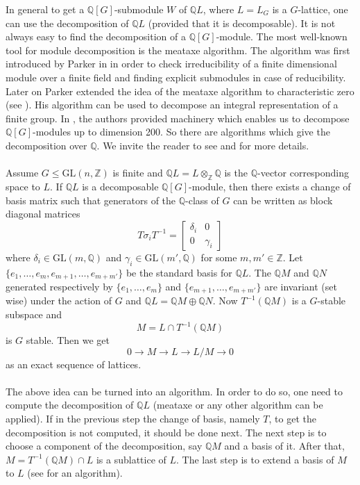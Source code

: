 \documentclass[a4paper, 14pt]{extarticle}
\theoremstyle{plain}
\theoremstyle{definition}
\newcommand{\Z}{\ensuremath{\mathbb{Z}}}
\newcommand{\Q}{\ensuremath{\mathbb{Q}}}
\begin{document}
\noindent
In general to get a $\Q[G]$-submodule $W$ of $\Q L$, where $L = L_G$ is a $G$-lattice, one can use the decomposition of $\Q L$ (provided that it is decomposable). It is not always easy to find the decomposition of a $\Q[G]$-module. The most well-known tool for module decomposition is the meataxe algorithm. The algorithm was first introduced by Parker in \cite{Parker} in order to check irreducibility of a finite dimensional module over a finite field and finding explicit submodules in case of reducibility. Later on Parker extended the idea of the meataxe algorithm to characteristic zero (see \cite{Parker2}). His algorithm can be used to decompose an integral representation of a finite group. In \cite{Plesken2}, the authors provided machinery which enables us to decompose $\Q[G]$-modules up to dimension 200. So there are algorithms which give the decomposition over $\Q$. We invite the reader to see \cite{Lux} and \cite{Holt} for more details. \\
\\
Assume $G \leq \mathrm{GL}(n,\Z)$ is finite and $\Q L = L \otimes_{\Z} \Q$ is the $\Q$-vector corresponding space to $L$. If $\Q L$ is a decomposable $\Q[G]$-module, then there exists a change of basis matrix such that generators of the $\Q$-class of $G$ can be written as block diagonal matrices
$$
T \sigma_i T^{-1} =  \left[ \begin{array}{c|c}
\delta_i & 0 \\
\hline
0 & \gamma_i
\end{array} \right]
$$
where $\delta_i	\in \mathrm{GL}(m,\Q)$ and $ \gamma_i \in \mathrm{GL}(m',\Q)$ for some $m, m' \in \Z$. Let $\lbrace e_1, \ldots, e_m, e_{m+1}, \ldots , e_{m+m'}\rbrace$ be the standard basis for $\Q L$. The $\Q M$ and $\Q N$ generated respectively by $\lbrace e_1, \ldots, e_m \rbrace$ and 
$\lbrace e_{m+1}, \ldots , e_{m+m'} \rbrace$ are invariant (set wise) under the action of $G$ and $\Q L = \Q M \oplus \Q N$. Now $T^{-1}(\Q M)$ is a $G$-stable subspace and $$M = L \cap T^{-1}(\Q M) $$ is $G$ stable. Then we get 
$$0 \longrightarrow M \longrightarrow L \longrightarrow L/M \longrightarrow 0$$
as an exact sequence of lattices.\\
\\
The above idea can be turned into an algorithm. In order to do so, one need to compute the decomposition of $\Q L$ (meataxe or any other algorithm can be applied). If in the previous step the change of basis, namely $T$, to get the decomposition is not computed, it should be done next. The next step is to choose a component of the decomposition, say $\Q M$ and a basis of it. After that, $M = T^{-1}(\Q M) \cap L$ is a sublattice of $L$. The last step is to extend a basis of $M$ to $L$ (see \cite{LatticeBase} for an algorithm). \\
\\
\end{document}
